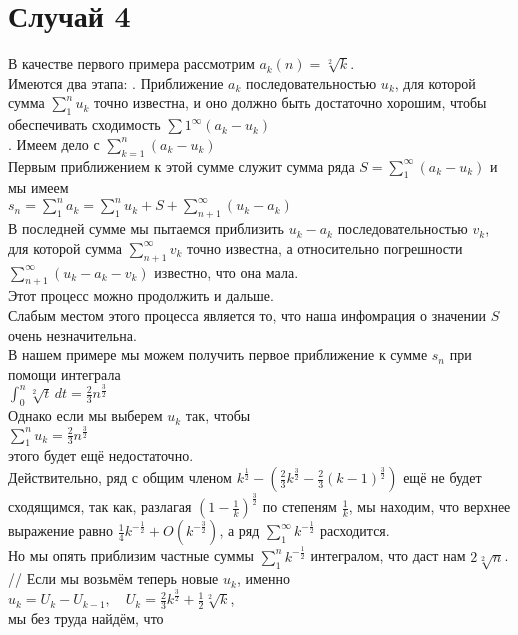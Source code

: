 \documentclass{report}
\begin{document}
\section{Случай 4}
В качестве первого примера рассмотрим $a_k(n)=\sqrt[2]{k}$. \\
Имеются два этапа:
. Приближение $a_k$ последовательностью $u_k$, для которой сумма $\sum_{1}^{n}u_k$ точно известна, и оно должно быть достаточно хорошим, чтобы обеспечивать сходимость $\sum{1}^{\infty}(a_k-u_k)$ \\
. Имеем дело с $\sum_{k=1}^{n}(a_k-u_k)$ \\
Первым приближением к этой сумме служит сумма ряда $S=\sum_{1}^{\infty}(a_k-u_k)$ и мы имеем \\
$s_n=\sum_{1}^{n}a_k=\sum_{1}^{n}u_k+S+\sum_{n+1}^{\infty}(u_k-a_k)$ \\
В последней сумме мы пытаемся приблизить $u_k-a_k$ последовательностью $v_k$, для которой сумма $\sum_{n+1}^{\infty}v_k$ точно известна, а относительно погрешности $\sum_{n+1}^{\infty}(u_k-a_k-v_k)$ известно, что она мала. \\
Этот процесс можно продолжить и дальше. \\
Слабым местом этого процесса является то, что наша инфомрация о значении $S$ очень незначительна. \\
В нашем примере мы можем получить первое приближение к сумме $s_n$ при помощи интеграла \\
$\int_{0}^{n}\sqrt[2]{t}\,dt=\frac{2}{3}n^\frac{3}{2}$ \\
Однако если мы выберем $u_k$ так, чтобы \\
$\sum_{1}^{n}u_k=\frac{2}{3}n^\frac{3}{2}$ \\
этого будет ещё недостаточно. \\
Действительно, ряд с общим членом $k^\frac{1}{2}-\left(\frac{2}{3}k^\frac{3}{2}-\frac{2}{3}(k-1)^\frac{3}{2}\right)$ ещё не будет сходящимся, так как, разлагая $(1-\frac{1}{k})^\frac{3}{2}$ по степеням $\frac{1}{k}$,
мы находим, что верхнее выражение равно $\frac{1}{4}k^{-\frac{1}{2}}+O\left(k^{-\frac{3}{2}}\right)$, а ряд $\sum_{1}^{\infty}k^{-\frac{1}{2}}$ расходится. \\
Но мы опять приблизим частные суммы $\sum_{1}^{n}k^{-\frac{1}{2}}$ интегралом, что даст нам $2\sqrt[2]{n}$. //
Если мы возьмём теперь новые $u_k$, именно $u_k=U_k-U_{k-1},\quad U_k=\frac{2}{3}k^\frac{3}{2}+\frac{1}{2}\sqrt[2]{k}$, \\
мы без труда найдём, что \\
\end{document}
